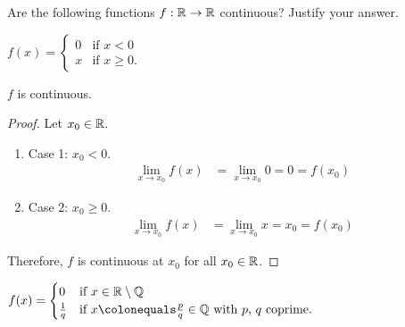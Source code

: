\begin{problem}
  Are the following functions $f : \mathbb{R} \to \mathbb{R}$ continuous?
  Justify your answer.

  \begin{enumroman}
    \item $\displaystyle f(x) = \begin{cases}
        0 & \text{if } x < 0 \\
        x & \text{if } x \geq 0.
      \end{cases}$
      \begin{answer}
        $f$ is continuous.
        \begin{proof}
          Let $x_0 \in \mathbb{R}$.
          \begin{enumerate}
            \item Case 1: $x_0 < 0$.
              \begin{align*}
                \lim_{x \to x_0}{f(x)} &= \lim_{x \to x_0}{0} = 0 = f(x_0)
              \end{align*}
            \item Case 2: $x_0 \geq 0$.
              \begin{align*}
                \lim_{x \to x_0}{f(x)} &= \lim_{x \to x_0}{x} = x_0 = f(x_0)
              \end{align*}
          \end{enumerate}
          Therefore, $f$ is continuous at $x_0$ for all $x_0 \in \mathbb{R}$.
        \end{proof}
      \end{answer}

    \newpage
    \item $\displaystyle f(x) = \begin{cases}
        0 & \text{if } x \in \R \setminus \Q \\
        \frac{1}{q} & \text{if } x \colonequals \frac{p}{q} \in \Q \text{ with $p$, $q$ coprime}.
      \end{cases}$


\end{enumroman}
\end{problem}
